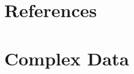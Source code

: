 \documentclass[10pt,a4paper,master=cws, masteroption=ai,english,inputenc=utf8]{kulemt}
\begin{document}
\chapter{References\label{chap:References}\label{test}}
\chapter{Complex Data\label{chap:ComplexData}}



\end{document}
